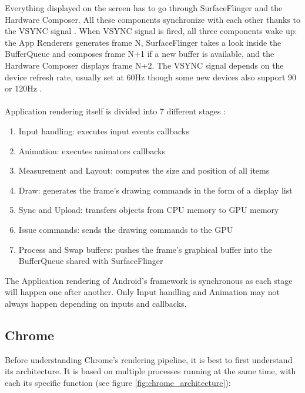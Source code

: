 \documentclass{kththesis}
\begin{document}


Everything displayed on the screen has to go through SurfaceFlinger and the Hardware Composer.
All these components synchronize with each other thanks to the VSYNC signal \cite{vsync}. When VSYNC signal is fired, all three components wake up: the App Renderers generates frame N, SurfaceFlinger takes a look inside the BufferQueue and composes frame N+1 if a new buffer is available, and the Hardware Composer displays frame N+2. The VSYNC signal depends on the device refresh rate, usually set at 60Hz though some new devices also support 90 or 120Hz \cite{refresh_rate}.

\paragraph{}
Application rendering itself is divided into 7 different stages \cite{app_rendering}:
\begin{enumerate}
    \item Input handling: executes input events callbacks
    \item Animation: executes animators callbacks
    \item Measurement and Layout: computes the size and position of all items
    \item Draw: generates the frame's drawing commands in the form of a display list
    \item Sync and Upload: transfers objects from CPU memory to GPU memory
    \item Issue commands: sends the drawing commands to the GPU
    \item Process and Swap buffers: pushes the frame's graphical buffer into the BufferQueue shared with SurfaceFlinger
\end{enumerate}

The Application rendering of Android's framework is synchronous as each stage will happen one after another. Only Input handling and Animation may not always happen depending on inputs and callbacks.

\subsection{Chrome}
Before understanding Chrome's rendering pipeline, it is best to first understand its architecture. It is based on multiple processes running at the same time, with each its specific function \cite{chrome_architecture} (see figure \ref{fig:chrome_architecture}):
\end{document}
